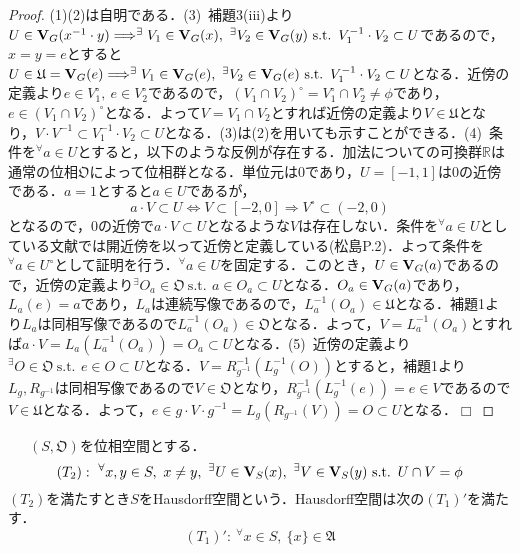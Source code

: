 \documentclass[a4paper,11pt]{jsarticle}
\newtheorem{proof}{証明}
\def\qed{\hfill $\Box$}
\newcommand{\st}{\mathrm{s.t.}\,}  %
\begin{document}
\begin{proof}
(1)(2)は自明である．(3){\ }補題3(iii)より$U\in{\bf V}_G(x^{-1}\cdot y) \Longrightarrow ^\exists V_1\in{\bf V}_G(x),{\ } ^\exists V_2\in{\bf V}_G(y){\ }\st{\ }V_1^{-1}\cdot V_2\subset U$であるので，$x=y=e$とすると$U\in \mathfrak{U}={\bf V}_G(e) \Longrightarrow ^\exists V_1\in{\bf V}_G(e),{\ } ^\exists V_2\in{\bf V}_G(e){\ }\st{\ }V_1^{-1}\cdot V_2\subset U$となる．近傍の定義より$e\in V_1^\circ,{\ }e\in V_2^\circ$であるので，$(V_1\cap V_2)^\circ=V_1^\circ\cap V_2^\circ\neq\phi$であり，$e\in (V_1\cap V_2)^\circ$となる．よって$V=V_1\cap V_2$とすれば近傍の定義より$V\in\mathfrak{U}$となり，$V\cdot V^{-1}\subset V_1^{-1}\cdot V_2\subset U$となる．(3)は(2)を用いても示すことができる．(4){\ }条件を$^\forall a\in U$とすると，以下のような反例が存在する．加法についての可換群$\mathbb{R}$は通常の位相$\mathfrak{O}$によって位相群となる．単位元は$0$であり，$U=[-1,1]$は$0$の近傍である．$a=1$とすると$a\in U$であるが，
\begin{equation*}
a\cdot V \subset U \Longleftrightarrow V\subset [-2,0] \Longrightarrow V^\circ \subset (-2,0)
\end{equation*}
となるので，$0$の近傍で$a\cdot V \subset U$となるような$V$は存在しない．条件を$^\forall a\in U$としている文献では開近傍を以って近傍と定義している(松島P.2)．よって条件を$^\forall a\in U^\circ$として証明を行う．$^\forall a\in U$を固定する．このとき，$U\in{\bf V}_G(a)$であるので，近傍の定義より$^\exists O_a\in\mathfrak{O}{\ }\st{\ }a\in O_a\subset U$となる．$O_a\in{\bf V}_G(a)$であり，$L_a(e)=a$であり，$L_a$は連続写像であるので，$L_a^{-1}(O_a)\in\mathfrak{U}$となる．補題1より$L_a$は同相写像であるので$L_a^{-1}(O_a)\in\mathfrak{O}$となる．よって，$V=L_a^{-1}(O_a)$とすれば$a\cdot V=L_a(L_a^{-1}(O_a))=O_a\subset U$となる．(5){\ }近傍の定義より$^\exists O\in\mathfrak{O}{\ }\st{\ }e\in O\subset U$となる．$V=R_{g^{-1}}^{-1}(L_g^{-1}(O))$とすると，補題1より$L_g,R_{g^{-1}}$は同相写像であるので$V\in\mathfrak{O}$となり，$R_{g^{-1}}^{-1}(L_g^{-1}(e))=e\in V$であるので$V\in\mathfrak{U}$となる．よって，$e\in g\cdot V\cdot g^{-1}=L_g(R_{g^{-1}}(V))=O\subset U$となる．\qed
\end{proof}
%
%
%
{\ }{\ }{\ }$(S,\mathfrak{O})$を位相空間とする．
\begin{equation*}
(T_2):{\ } ^\forall x,y\in S,{\ }x\neq y,{\ } ^\exists U\in{\bf V}_S(x),{\ } ^\exists V\in{\bf V}_S(y){\ }\st{\ }U\cap V=\phi
\end{equation*}
$(T_2)$を満たすとき$S$をHausdorff空間という．Hausdorff空間は次の$(T_1)'$を満たす．
\begin{equation*}
(T_1)':{\ } ^\forall x\in S,{\ }\{x\}\in\mathfrak{A}
\end{equation*}
\end{document}
